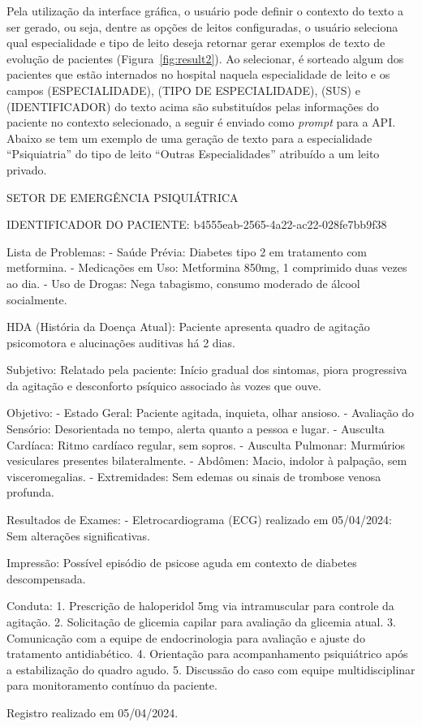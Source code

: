 Pela utilização da interface gráfica, o usuário pode definir o contexto do texto a ser gerado, ou seja, dentre as opções de leitos configuradas, o usuário seleciona qual especialidade e tipo de leito deseja retornar gerar exemplos de texto de evolução de pacientes (Figura~\ref{fig:result2}). Ao selecionar, é sorteado algum dos pacientes que estão internados no hospital naquela especialidade de leito e os campos (ESPECIALIDADE), (TIPO DE ESPECIALIDADE), (SUS) e (IDENTIFICADOR) do texto acima são substituídos pelas informações do paciente no contexto selecionado, a seguir é enviado como \textit{prompt} para a API. Abaixo se tem um exemplo de uma geração de texto para a especialidade ``Psiquiatria'' do tipo de leito ``Outras Especialidades'' atribuído a um leito privado.

\begin{spverbatim}
SETOR DE EMERGÊNCIA PSIQUIÁTRICA

IDENTIFICADOR DO PACIENTE: b4555eab-2565-4a22-ac22-028fe7bb9f38

Lista de Problemas:
- Saúde Prévia: Diabetes tipo 2 em tratamento com metformina.
- Medicações em Uso: Metformina 850mg, 1 comprimido duas vezes ao dia.
- Uso de Drogas: Nega tabagismo, consumo moderado de álcool socialmente.

HDA (História da Doença Atual):
Paciente apresenta quadro de agitação psicomotora e alucinações auditivas há 2 dias.

Subjetivo:
Relatado pela paciente: Início gradual dos sintomas, piora progressiva da agitação e desconforto psíquico associado às vozes que ouve.

Objetivo:
- Estado Geral: Paciente agitada, inquieta, olhar ansioso.
- Avaliação do Sensório: Desorientada no tempo, alerta quanto a pessoa e lugar.
- Ausculta Cardíaca: Ritmo cardíaco regular, sem sopros.
- Ausculta Pulmonar: Murmúrios vesiculares presentes bilateralmente.
- Abdômen: Macio, indolor à palpação, sem visceromegalias.
- Extremidades: Sem edemas ou sinais de trombose venosa profunda.

Resultados de Exames:
- Eletrocardiograma (ECG) realizado em 05/04/2024: Sem alterações significativas.

Impressão:
Possível episódio de psicose aguda em contexto de diabetes descompensada.

Conduta:
1. Prescrição de haloperidol 5mg via intramuscular para controle da agitação.
2. Solicitação de glicemia capilar para avaliação da glicemia atual.
3. Comunicação com a equipe de endocrinologia para avaliação e ajuste do tratamento antidiabético.
4. Orientação para acompanhamento psiquiátrico após a estabilização do quadro agudo.
5. Discussão do caso com equipe multidisciplinar para monitoramento contínuo da paciente.

Registro realizado em 05/04/2024.
\end{spverbatim}

